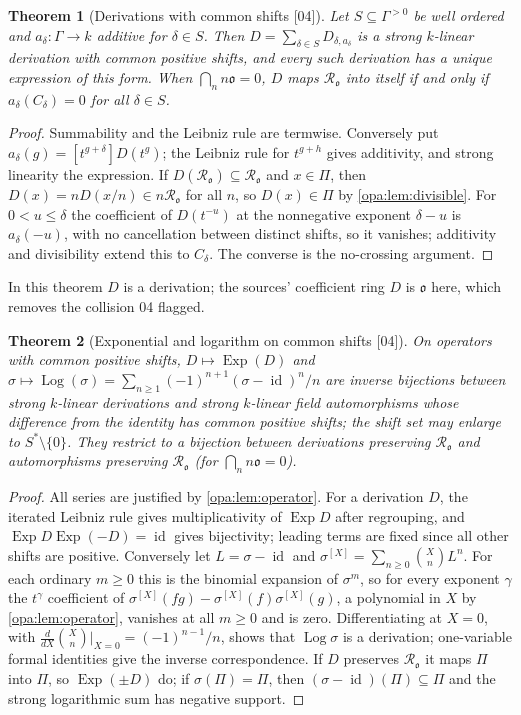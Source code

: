 \documentclass[11pt,oneside]{article}
\numberwithin{equation}{section}
\newtheorem{theorem}{Theorem}[section]
\theoremstyle{definition}
\theoremstyle{remark}
\newcommand{\oo}{\mathfrak o}
\newcommand{\Ro}{\mathcal R_{\oo}}
\newcommand{\id}{\operatorname{id}}
\newcommand{\Exp}{\operatorname{Exp}}
\newcommand{\Log}{\operatorname{Log}}
\newcommand{\coef}[2]{[t^{#1}]#2}
\newcommand{\src}[1]{\textup{\textsf{\small[#1]}}}
\begin{document}
\begin{theorem}[Derivations with common shifts \src{04}]\label{opa:thm:derivcriterion}
Let $S\subseteq\Gamma^{>0}$ be well ordered and $a_\delta:\Gamma\to k$ additive
for $\delta\in S$. Then $D=\sum_{\delta\in S}D_{\delta,a_\delta}$ is a strong
$k$-linear derivation with common positive shifts, and every such derivation
has a unique expression of this form. When $\bigcap_nn\oo=0$, $D$ maps $\Ro$ into
itself if and only if $a_\delta(C_\delta)=0$ for all $\delta\in S$.
\end{theorem}
\begin{proof}
Summability and the Leibniz rule are termwise. Conversely put
$a_\delta(g)=\coef{g+\delta}{D(t^g)}$; the Leibniz rule for $t^{g+h}$ gives
additivity, and strong linearity the expression. If $D(\Ro)\subseteq\Ro$ and
$x\in\Pi$, then $D(x)=nD(x/n)\in n\Ro$ for all $n$, so $D(x)\in\Pi$ by
\cref{opa:lem:divisible}. For $0<u\le\delta$ the coefficient of $D(t^{-u})$ at
the nonnegative exponent $\delta-u$ is $a_\delta(-u)$, with no cancellation
between distinct shifts, so it vanishes; additivity and divisibility extend
this to $C_\delta$. The converse is the no-crossing argument.
\end{proof}

In this theorem $D$ is a derivation; the sources' coefficient ring $D$ is
$\oo$ here, which removes the collision 04 flagged.

\begin{theorem}[Exponential and logarithm on common shifts \src{04}]\label{opa:thm:lie}
On operators with common positive shifts, $D\mapsto\Exp(D)$ and
$\sigma\mapsto\Log(\sigma)=\sum_{n\ge1}(-1)^{n+1}(\sigma-\id)^n/n$ are inverse
bijections between strong $k$-linear derivations and strong $k$-linear field
automorphisms whose difference from the identity has common positive shifts;
the shift set may enlarge to $S^*\setminus\{0\}$. They restrict to a
bijection between derivations preserving $\Ro$ and automorphisms preserving
$\Ro$ (for $\bigcap_nn\oo=0$).
\end{theorem}
\begin{proof}
All series are justified by \cref{opa:lem:operator}. For a derivation $D$, the
iterated Leibniz rule gives multiplicativity of $\Exp D$ after regrouping, and
$\Exp D\Exp(-D)=\id$ gives bijectivity; leading terms are fixed since all other
shifts are positive. Conversely let $L=\sigma-\id$ and
$\sigma^{[X]}=\sum_{n\ge0}\binom XnL^n$. For each ordinary $m\ge0$ this is the
binomial expansion of $\sigma^m$, so for every exponent $\gamma$ the $t^\gamma$
coefficient of $\sigma^{[X]}(fg)-\sigma^{[X]}(f)\sigma^{[X]}(g)$, a polynomial in
$X$ by \cref{opa:lem:operator}, vanishes at all $m\ge0$ and is zero.
Differentiating at $X=0$, with $\frac{d}{dX}\binom Xn\big|_{X=0}=(-1)^{n-1}/n$,
shows that $\Log\sigma$ is a derivation; one-variable formal identities give
the inverse correspondence. If $D$ preserves $\Ro$ it maps $\Pi$ into $\Pi$, so
$\Exp(\pm D)$ do; if $\sigma(\Pi)=\Pi$, then $(\sigma-\id)(\Pi)\subseteq\Pi$ and the
strong logarithmic sum has negative support.
\end{proof}
\end{document}
